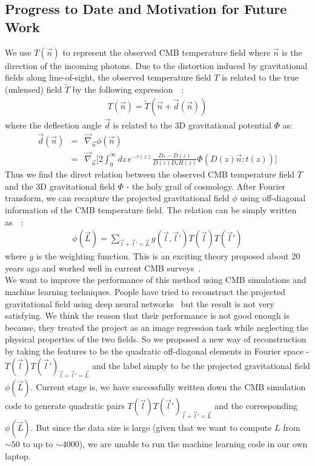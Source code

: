 \documentclass[12pt]{article}
\begin{document}
\begin{small}
\section{Progress to Date and Motivation for Future Work}
We use $T(\vec{n})$ to represent the observed CMB temperature field where $\vec{n}$ is the direction of the incoming photons. Due to the distortion induced by gravitational fields along line-of-sight, the observed temperature field $T$ is related to the true (unlensed) field $\tilde{T}$ by the following expression~\cite{Hu:2001tn}~\cite{Li:2019qkp}:
\begin{eqnarray}
T(\vec{n})=\tilde{T}(\vec{n}+\vec{d}(\vec{n}))
\end{eqnarray}
where the deflection angle $\vec{d}$ is related to the 3D gravitational potential $\Phi$ as:
\begin{eqnarray}
\vec{d}(\vec{n})&=& \vec{\nabla}_{\vec{n}} {\phi}(\vec{n})\nonumber \\
&=&\vec{\nabla}_{\vec{n}}\bigg[ 2\int_{0}^{\infty} dz\, e^{-\tau(z)}\frac{D_{*}-D(z)}{D(z)D_{*}H(z)}\Phi(D(z)\vec{n};t(z)) \bigg]
\end{eqnarray}
Thus we find the direct relation between the observed CMB temperature field $T$ and the 3D gravitational field $\Phi$ - the holy grail of cosmology. After Fourier transform, we can recapture the projected gravitational field $\phi$ using off-diagonal information of the CMB temperature field. The relation can be simply written as~\cite{Hu:2001kj}~\cite{Okamoto:2003zw}:
\begin{eqnarray}
\phi(\vec{L}) = \sum_{\vec{l}+\vec{l}'=\vec{L}}g(\vec{l},\vec{l}')  T(\vec{l})T(\vec{l}')
\end{eqnarray}
where $g$ is the weighting function. This is an exciting theory proposed about 20 years ago and worked well in current CMB surveys~\cite{Aghanim:2018oex}. \\
We want to improve the performance of this method using CMB simulations and machine learning techniques. People have tried to reconstruct the projected gravitational field using deep neural networks~\cite{Caldeira:2018ojb} but the result is not very satisfying. We think the reason that their performance is not good enough is because, they treated the project as an image regression task while neglecting the physical properties of the two fields. So we proposed a new way of reconstruction by taking the features to be the quadratic off-diagonal elements in Fourier space - $T(\vec{l})T(\vec{l}')_{\vec{l}+\vec{l}'=\vec{L}}$ and the label simply to be the projected gravitational field $\phi(\vec{L})$. Current stage is, we have successfully written down the CMB simulation code to generate quadratic pairs $T(\vec{l})T(\vec{l}')_{\vec{l}+\vec{l}'=\vec{L}}$ and the corresponding $\phi(\vec{L})$. But since the data size is large (given that we want to compute $L$ from $\sim 50$ to up to $\sim 4000$), we are unable to run the machine learning code in our own laptop.


\end{small}
\end{document}
